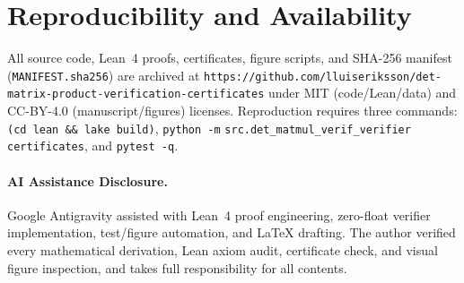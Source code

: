 \documentclass[10pt,twocolumn]{article}
\begin{document}
\section{Reproducibility and Availability}
All source code, Lean~4 proofs, certificates, figure scripts, and SHA-256 manifest (\texttt{MANIFEST.sha256}) are archived at \nolinkurl{https://github.com/lluiseriksson/det-matrix-product-verification-certificates} under MIT (code/Lean/data) and CC-BY-4.0 (manuscript/figures) licenses. Reproduction requires three commands: \texttt{(cd lean \&\& lake build)}, \texttt{python -m} \nolinkurl{src.det_matmul_verif_verifier} \texttt{certificates}, and \texttt{pytest -q}.

\paragraph{AI Assistance Disclosure.}
Google Antigravity assisted with Lean~4 proof engineering, zero-float verifier implementation, test/figure automation, and LaTeX drafting. The author verified every mathematical derivation, Lean axiom audit, certificate check, and visual figure inspection, and takes full responsibility for all contents.



\end{document}
